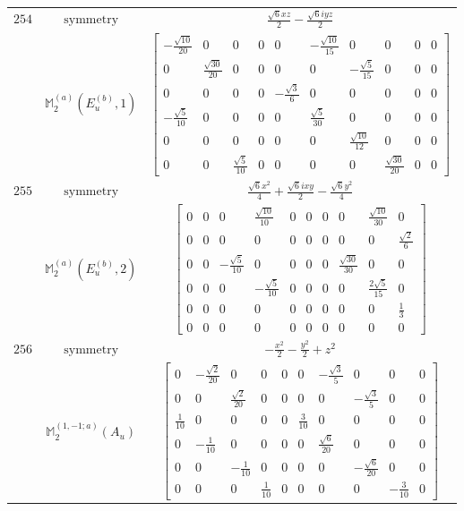 \documentclass[fleqn,8pt,landscape]{jsarticle}
\begin{document}
\begin{longtable}{ccc}
$ 254 $ & $ \text{symmetry} $ & $ \frac{\sqrt{6} x z}{2} - \frac{\sqrt{6} i y z}{2} $ \\
$  $ & $ \mathbb{M}_{2}^{(a)}(E_{u}^{(b)},1) $ & $ \begin{bmatrix} - \frac{\sqrt{10}}{20} & 0 & 0 & 0 & 0 & - \frac{\sqrt{10}}{15} & 0 & 0 & 0 & 0 \\ 0 & \frac{\sqrt{30}}{20} & 0 & 0 & 0 & 0 & - \frac{\sqrt{5}}{15} & 0 & 0 & 0 \\ 0 & 0 & 0 & 0 & - \frac{\sqrt{3}}{6} & 0 & 0 & 0 & 0 & 0 \\ - \frac{\sqrt{5}}{10} & 0 & 0 & 0 & 0 & \frac{\sqrt{5}}{30} & 0 & 0 & 0 & 0 \\ 0 & 0 & 0 & 0 & 0 & 0 & \frac{\sqrt{10}}{12} & 0 & 0 & 0 \\ 0 & 0 & \frac{\sqrt{5}}{10} & 0 & 0 & 0 & 0 & \frac{\sqrt{30}}{20} & 0 & 0 \end{bmatrix} $ \\ \hline
$ 255 $ & $ \text{symmetry} $ & $ \frac{\sqrt{6} x^{2}}{4} + \frac{\sqrt{6} i x y}{2} - \frac{\sqrt{6} y^{2}}{4} $ \\
$  $ & $ \mathbb{M}_{2}^{(a)}(E_{u}^{(b)},2) $ & $ \begin{bmatrix} 0 & 0 & 0 & \frac{\sqrt{10}}{10} & 0 & 0 & 0 & 0 & \frac{\sqrt{10}}{30} & 0 \\ 0 & 0 & 0 & 0 & 0 & 0 & 0 & 0 & 0 & \frac{\sqrt{2}}{6} \\ 0 & 0 & - \frac{\sqrt{5}}{10} & 0 & 0 & 0 & 0 & \frac{\sqrt{30}}{30} & 0 & 0 \\ 0 & 0 & 0 & - \frac{\sqrt{5}}{10} & 0 & 0 & 0 & 0 & \frac{2 \sqrt{5}}{15} & 0 \\ 0 & 0 & 0 & 0 & 0 & 0 & 0 & 0 & 0 & \frac{1}{3} \\ 0 & 0 & 0 & 0 & 0 & 0 & 0 & 0 & 0 & 0 \end{bmatrix} $ \\ \hline
$ 256 $ & $ \text{symmetry} $ & $ - \frac{x^{2}}{2} - \frac{y^{2}}{2} + z^{2} $ \\
$  $ & $ \mathbb{M}_{2}^{(1,-1;a)}(A_{u}) $ & $ \begin{bmatrix} 0 & - \frac{\sqrt{2}}{20} & 0 & 0 & 0 & 0 & - \frac{\sqrt{3}}{5} & 0 & 0 & 0 \\ 0 & 0 & \frac{\sqrt{2}}{20} & 0 & 0 & 0 & 0 & - \frac{\sqrt{3}}{5} & 0 & 0 \\ \frac{1}{10} & 0 & 0 & 0 & 0 & \frac{3}{10} & 0 & 0 & 0 & 0 \\ 0 & - \frac{1}{10} & 0 & 0 & 0 & 0 & \frac{\sqrt{6}}{20} & 0 & 0 & 0 \\ 0 & 0 & - \frac{1}{10} & 0 & 0 & 0 & 0 & - \frac{\sqrt{6}}{20} & 0 & 0 \\ 0 & 0 & 0 & \frac{1}{10} & 0 & 0 & 0 & 0 & - \frac{3}{10} & 0 \end{bmatrix} $ \\ \hline

\end{longtable}
\end{document}
